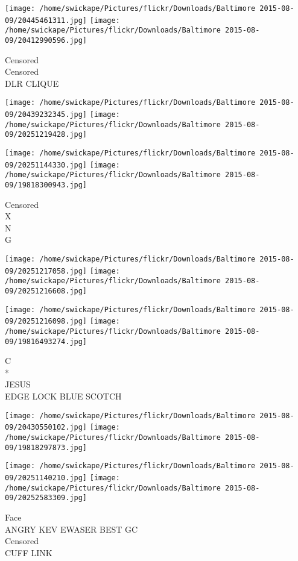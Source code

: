 \documentclass[10pt,letterpaper]{article}
\begin{document}
\vspace{0.25in}
\texttt{[image: /home/swickape/Pictures/flickr/Downloads/Baltimore 2015-08-09/20445461311.jpg]}
\texttt{[image: /home/swickape/Pictures/flickr/Downloads/Baltimore 2015-08-09/20412990596.jpg]}

Censored\\
Censored\\
DLR CLIQUE\\
\pagebreak

\texttt{[image: /home/swickape/Pictures/flickr/Downloads/Baltimore 2015-08-09/20439232345.jpg]}
\texttt{[image: /home/swickape/Pictures/flickr/Downloads/Baltimore 2015-08-09/20251219428.jpg]}

\texttt{[image: /home/swickape/Pictures/flickr/Downloads/Baltimore 2015-08-09/20251144330.jpg]}
\texttt{[image: /home/swickape/Pictures/flickr/Downloads/Baltimore 2015-08-09/19818300943.jpg]}

Censored\\
X\\
N\\
G\\
\pagebreak

\texttt{[image: /home/swickape/Pictures/flickr/Downloads/Baltimore 2015-08-09/20251217058.jpg]}
\texttt{[image: /home/swickape/Pictures/flickr/Downloads/Baltimore 2015-08-09/20251216608.jpg]}

\texttt{[image: /home/swickape/Pictures/flickr/Downloads/Baltimore 2015-08-09/20251216098.jpg]}
\texttt{[image: /home/swickape/Pictures/flickr/Downloads/Baltimore 2015-08-09/19816493274.jpg]}

C\\
*\\
JESUS\\
EDGE LOCK BLUE SCOTCH\\
\pagebreak

\texttt{[image: /home/swickape/Pictures/flickr/Downloads/Baltimore 2015-08-09/20430550102.jpg]}
\texttt{[image: /home/swickape/Pictures/flickr/Downloads/Baltimore 2015-08-09/19818297873.jpg]}

\texttt{[image: /home/swickape/Pictures/flickr/Downloads/Baltimore 2015-08-09/20251140210.jpg]}
\texttt{[image: /home/swickape/Pictures/flickr/Downloads/Baltimore 2015-08-09/20252583309.jpg]}

Face\\
ANGRY KEV EWASER BEST GC\\
Censored\\
CUFF LINK\\
\pagebreak
\end{document}
